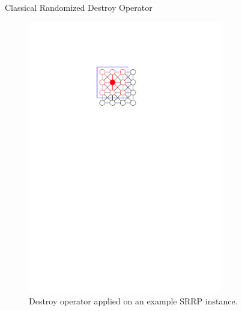 \documentclass[aspectratio=1610]{beamer}
\begin{document}
\begin{frame}{Classical Randomized Destroy Operator}
\begin{figure}
\begin{overprint}
			\centering\includegraphics[width=0.75\textwidth, page=16]{figures/graphics.pdf}
		\end{overprint}
		\caption{Destroy operator applied on an example SRRP instance.}
	\end{figure}
\end{frame}
\end{document}
